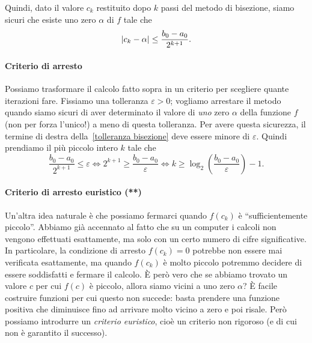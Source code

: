\documentclass[a4paper]{report}
\DeclarePairedDelimiter{\abs}{\lvert}{\rvert}
\theoremstyle{definition}
\theoremstyle{remark}
\begin{document}
Quindi, dato il valore $c_k$ restituito dopo $k$ passi del metodo di bisezione, siamo sicuri che esiste uno zero $\alpha$ di $f$ tale che 
\begin{equation} \label{tolleranza bisezione}
    \abs{c_k - \alpha} \leq \frac{b_0-a_0}{2^{k+1}}.    
\end{equation}

\paragraph{Criterio di arresto} Possiamo trasformare il calcolo fatto sopra in un criterio per scegliere quante iterazioni fare. Fissiamo una tolleranza $\varepsilon>0$; vogliamo arrestare il metodo quando siamo sicuri di aver determinato il valore di \emph{uno} zero $\alpha$ della funzione $f$ (non per forza l'unico!) a meno di questa tolleranza. Per avere questa sicurezza, il termine di destra della~\eqref{tolleranza bisezione} deve essere minore di $\varepsilon$. Quindi prendiamo il più piccolo intero $k$ tale che
\[
\frac{b_0 - a_0}{2^{k+1}} \leq \varepsilon \iff 2^{k+1} \geq \frac{b_0 - a_0}{\varepsilon} \iff k \geq \log_2 \left(\frac{b_0 - a_0}{\varepsilon}\right)-1.
\]

\paragraph{Criterio di arresto euristico (**)} Un'altra idea naturale è che possiamo fermarci quando $f(c_k)$ è ``sufficientemente piccolo''. Abbiamo già accennato al fatto che su un computer i calcoli non vengono effettuati esattamente, ma solo con un certo numero di cifre significative. In particolare, la condizione di arresto $f(c_k) = 0$ potrebbe non essere mai verificata esattamente, ma quando $f(c_k)$ è molto piccolo potremmo decidere di essere soddisfatti e fermare il calcolo. È però vero che se abbiamo trovato un valore $c$ per cui $f(c)$ è piccolo, allora siamo vicini a uno zero $\alpha$? È facile costruire funzioni per cui questo non succede: basta prendere una funzione positiva che diminuisce fino ad arrivare molto vicino a zero e poi risale. Però possiamo introdurre un \emph{criterio euristico}, cioè un criterio non rigoroso (e di cui non è garantito il successo). 
\end{document}
